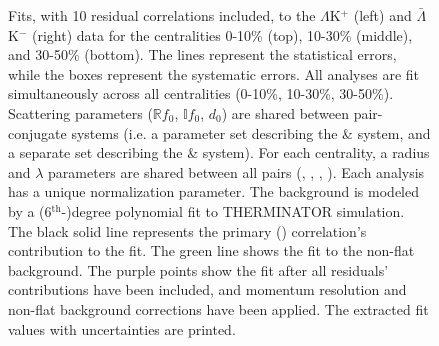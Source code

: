 \documentclass[../AnalysisNoteJBuxton.tex]{subfiles}
\renewcommand{\ResNum}{_10Res}
\renewcommand{\SaveNameModLamKch}{\MomRes\NonFlatBgd\ResNum\PrimMaxDecay\ResMethod\ParamFixAndShareLamKch}
\begin{document}
\begin{landscape}
\begin{figure}[h!]
  \centering
  \caption[$\Lambda$K$^{+}$($\bar{\Lambda}$K$^{-}$) Fits with 10 Residuals]{Fits, with 10 residual correlations included, to the $\Lambda$K$^{+}$ (left) and $\bar{\Lambda}$K$^{-}$ (right) data for the centralities 0-10\% (top), 10-30\% (middle), and 30-50\% (bottom).
 The lines represent the statistical errors, while the boxes represent the systematic errors.  
 All \LamKpm analyses are fit simultaneously across all centralities (0-10\%, 10-30\%, 30-50\%).
 Scattering parameters ($\mathbb{R}f_{0}$, $\mathbb{I}f_{0}$, $d_{0}$) are shared between pair-conjugate systems (i.e. a parameter set describing the \LamKchP \& \ALamKchM system, and a separate set describing the \LamKchM \& \ALamKchP system).
 For each centrality, a radius and $\lambda$ parameters are shared between all pairs (\LamKchP, \ALamKchM, \LamKchM, \ALamKchP).
 Each analysis has a unique normalization parameter.
 The background is modeled by a (6$^{\mathrm{th}}$-)degree polynomial fit to THERMINATOR simulation.
 The black solid line represents the primary (\LamK) correlation's contribution to the fit.  
 The green line shows the fit to the non-flat background.
 The purple points show the fit after all residuals' contributions have been included, and momentum resolution and non-flat background corrections have been applied.
 The extracted fit values with uncertainties are printed.}
  \label{fig:LamKchPwConjFits_10Res}
\end{figure}




\end{landscape}
\end{document}
